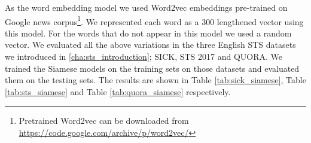 	
	As the word embedding model we used Word2vec embeddings \cite{DBLP:journals/corr/abs-1301-3781} pre-trained on Google news corpus\footnote{Pretrained Word2vec can be downloaded from \url{https://code.google.com/archive/p/word2vec/}}. We represented each word as a 300 lengthened vector using this model. For the words that do not appear in this model we used a random vector. We evaluated all the above variations in the three English STS datasets we introduced in \ref{cha:sts_introduction}; SICK, STS 2017 and QUORA. We trained the Siamese models on the training sets on those datasets and evaluated them on the testing sets. The results are shown in Table \ref{tab:sick_siamese}, Table \ref{tab:sts_siamese} and Table \ref{tab:quora_siamese} respectively. 
	
	 
	\begin{table}[htb]
		\centering
		\caption[Results for SICK with Siamese Neural Network]{Results for SICK dataset with different variants of Siamese Neural Network. For each variant, Pearson Correlation ($\bm{\rho}$) and Spearman Correlation ($\bm{\tau}$) are reported between the predicted values and the gold labels of the test set. Best result from all the variations is marked with ${\dagger}$.}  
		\label{tab:sick_siamese}
	\end{table}
	
